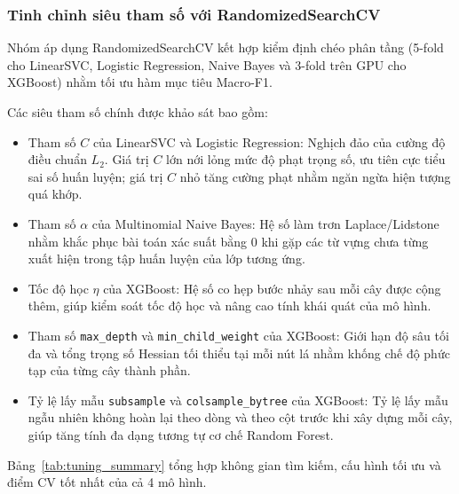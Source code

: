 \subsubsection{Tinh chỉnh siêu tham số với RandomizedSearchCV}\label{sec:tuning}
Nhóm áp dụng RandomizedSearchCV \cite{bergstra2012} kết hợp kiểm định chéo phân tầng (5-fold cho LinearSVC, Logistic Regression, Naive Bayes và 3-fold trên GPU cho XGBoost) nhằm tối ưu hàm mục tiêu Macro-F1.

Các siêu tham số chính được khảo sát bao gồm:
\begin{itemize}
    \item Tham số $C$ của LinearSVC và Logistic Regression: Nghịch đảo của cường độ điều chuẩn $L_2$. Giá trị $C$ lớn nới lỏng mức độ phạt trọng số, ưu tiên cực tiểu sai số huấn luyện; giá trị $C$ nhỏ tăng cường phạt nhằm ngăn ngừa hiện tượng quá khớp.
    \item Tham số $\alpha$ của Multinomial Naive Bayes: Hệ số làm trơn Laplace/Lidstone nhằm khắc phục bài toán xác suất bằng 0 khi gặp các từ vựng chưa từng xuất hiện trong tập huấn luyện của lớp tương ứng.
    \item Tốc độ học $\eta$ của XGBoost: Hệ số co hẹp bước nhảy sau mỗi cây được cộng thêm, giúp kiểm soát tốc độ học và nâng cao tính khái quát của mô hình.
    \item Tham số \texttt{max\_depth} và \texttt{min\_child\_weight} của XGBoost: Giới hạn độ sâu tối đa và tổng trọng số Hessian tối thiểu tại mỗi nút lá nhằm khống chế độ phức tạp của từng cây thành phần.
    \item Tỷ lệ lấy mẫu \texttt{subsample} và \texttt{colsample\_bytree} của XGBoost: Tỷ lệ lấy mẫu ngẫu nhiên không hoàn lại theo dòng và theo cột trước khi xây dựng mỗi cây, giúp tăng tính đa dạng tương tự cơ chế Random Forest.
\end{itemize}

Bảng~\ref{tab:tuning_summary} tổng hợp không gian tìm kiếm, cấu hình tối ưu và điểm CV tốt nhất của cả 4 mô hình.

